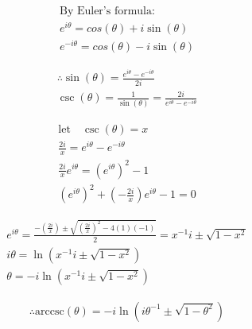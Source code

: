 \documentclass{../style}
\begin{document}
\begin{gather*}
	\text{By Euler's formula:} \\
	e^{i\theta} = cos(\theta) + i\sin(\theta) \\
	e^{-i\theta} = cos(\theta) - i\sin(\theta)
\end{gather*}

\begin{gather*}
	\therefore \sin(\theta) = \frac{e^{i\theta} - e^{-i\theta}}{2i} \\
	\csc(\theta) = \frac{1}{\sin(\theta)} = \frac{2i}{e^{i\theta} - e^{-i\theta}}
\end{gather*}

\begin{gather*}
	\text{let} \quad \csc(\theta) = x \\
	\frac{2i}{x} = e^{i\theta} - e^{-i\theta} \\
	\frac{2i}{x}e^{i\theta} = (e^{i\theta})^2 - 1 \\ 
	(e^{i\theta})^2 + (-\frac{2i}{x})e^{i\theta} - 1 = 0
\end{gather*}

\begin{gather*}
	e^{i\theta} = \frac{-(\frac{2i}{x}) \pm \sqrt{(\frac{2i}{x})^2 - 4(1)(-1)}}{2} = x^{-1}i \pm \sqrt{1 - x^2} \\
	i\theta = \ln(x^{-1}i \pm \sqrt{1 - x^2}) \\
	\theta = -i\ln(x^{-1}i \pm \sqrt{1 - x^2})
\end{gather*}

\begin{gather*}
	\therefore \text{arccsc}(\theta) = -i\ln(i\theta^{-1} \pm \sqrt{1 -\theta^2})
\end{gather*}
\end{document}
